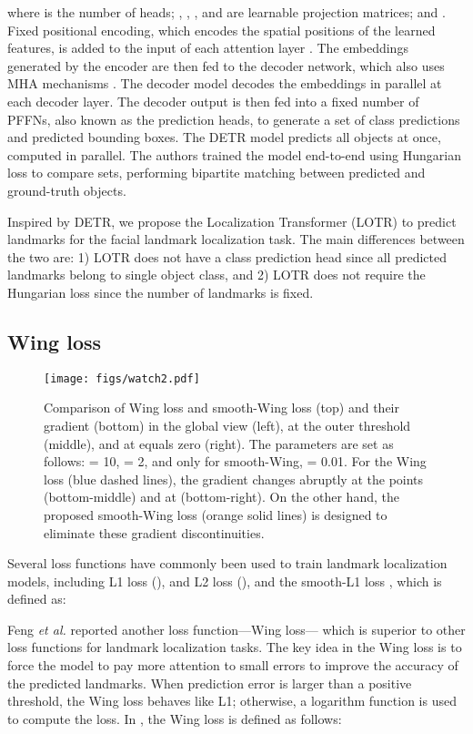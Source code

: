 \documentclass[journal]{IEEEtran}
\begin{document}
where  is the number of heads; , , , and  are learnable projection matrices; and .
Fixed positional encoding, which encodes the spatial positions of the learned features, is added to the input of each attention layer \cite{Carion2020}.
The embeddings generated by the encoder are then fed to the decoder network, which also uses MHA mechanisms \cite{Carion2020}.
The decoder model decodes the embeddings in parallel at each decoder layer.
The decoder output is then fed into a fixed number of PFFNs, also known as the prediction heads, to generate a set of class predictions and predicted bounding boxes.
The DETR model predicts all objects at once, computed in parallel.
The authors trained the model end-to-end using Hungarian loss to compare sets, performing bipartite matching between predicted and ground-truth objects.

Inspired by DETR, we propose the Localization Transformer (LOTR) to predict landmarks for the facial landmark localization task.
The main differences between the two are: 1) LOTR does not have a class prediction head since all predicted landmarks belong to single object class, and 2) LOTR does not require the Hungarian loss since the number of landmarks is fixed.

\subsection{Wing loss}\label{subsec:wing}

\begin{figure*}
    \centering
\texttt{[image: figs/watch2.pdf]}
    \caption{Comparison of Wing loss and smooth-Wing loss (top) and their gradient (bottom) in the global view (left), at the outer threshold  (middle), and at  equals zero (right). The parameters are set as follows:  = 10,  = 2, and only for smooth-Wing,  = 0.01. 
    For the Wing loss (blue dashed lines), the gradient changes abruptly at the points  (bottom-middle) and at  (bottom-right).
    On the other hand, the proposed smooth-Wing loss (orange solid lines) is designed to eliminate these gradient discontinuities. 
    }
    \label{fig:wing_vs_s-wing}
\end{figure*}
Several loss functions have commonly been used to train landmark localization models, including L1 loss (), and L2 loss (), and the smooth-L1 loss \cite{girshick2015}, which is defined as:

Feng \textit{et al.} \cite{Feng2017} reported another loss function---Wing loss--- which is superior to other loss functions for landmark localization tasks.
The key idea in the Wing loss is to force the model to pay more attention to small errors to improve the accuracy of the predicted landmarks. 
When prediction error is larger than a positive threshold, the Wing loss behaves like L1; otherwise, a logarithm function is used to compute the loss. 
In \cite{Feng2017}, the Wing loss is defined as follows:
\end{document}
